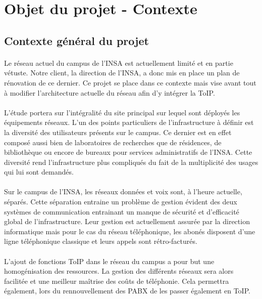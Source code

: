 \section{Objet du projet - Contexte}

\subsection{Contexte général du projet}

\paragraph{} Le réseau actuel du campus de l'INSA est actuellement limité et en partie vétuste. Notre client, la direction de l'INSA, a donc mis en place un plan de rénovation de ce dernier. Ce projet se place dans ce contexte mais vise avant tout à modifier l'architecture actuelle du réseau afin d'y intégrer la ToIP.
\paragraph{} L'étude portera sur l'intégralité du site principal sur lequel sont déployés les équipements réseaux. L'un des points particuliers de l'infrastructure à définir est la diversité des utilisateurs présents sur le campus. Ce dernier est en effet composé aussi bien de laboratoires de recherches que de résidences, de bibliothèque ou encore de bureaux pour services administratifs de l'INSA. Cette diversité rend l'infrastructure plus compliqués du fait de la multiplicité des usages qui lui sont demandés.
\paragraph{} Sur le campus de l'INSA, les réseaux données et voix sont, à l'heure actuelle, séparés. Cette séparation entraine un problème de gestion évident des deux systèmes de communication entrainant un manque de sécurité et d'efficacité global de l'infrastructure. Leur gestion est actuellement assurée par la direction informatique mais pour le cas du réseau téléphonique, les abonés disposent d'une ligne téléphonique classique et leurs appels sont rétro-facturés.
\paragraph{} L'ajout de fonctions ToIP dans le réseau du campus a pour but une homogénisation des ressources. La gestion des différents réseaux sera alors facilitée et une meilleur maîtrise des coûts de téléphonie. Cela permettra également, lors du rennouvellement des PABX de les passer également en ToIP.

